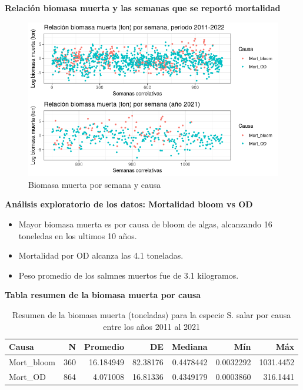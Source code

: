 \documentclass[
  ignorenonframetext,
]{beamer}
\begin{document}
\begin{frame}{\textbf{Relación biomasa muerta y las semanas que se
reportó mortalidad}}
\protect\hypertarget{relaciuxf3n-biomasa-muerta-y-las-semanas-que-se-reportuxf3-mortalidad}{}
\begin{figure}

{\centering \includegraphics[width=0.9\linewidth]{Biomasa_muerta_semana_causa} 

}

\caption{Biomasa muerta por semana y causa}\label{fig:unnamed-chunk-3}
\end{figure}
\end{frame}

\begin{frame}{\textbf{Análisis exploratorio de los datos: Mortalidad
bloom vs OD}}
\protect\hypertarget{anuxe1lisis-exploratorio-de-los-datos-mortalidad-bloom-vs-od}{}
\begin{itemize}
\item
  Mayor biomasa muerta es por causa de bloom de algas, alcanzando 16
  toneledas en los ultimos 10 años.
\item
  Mortalidad por OD alcanza las 4.1 toneladas.
\item
  Peso promedio de los salmnes muertos fue de 3.1 kilogramos.
\end{itemize}
\end{frame}

\begin{frame}{\textbf{Tabla resumen de la biomasa muerta por causa}}
\protect\hypertarget{tabla-resumen-de-la-biomasa-muerta-por-causa}{}
\begin{table}

\caption{\label{tab:unnamed-chunk-4}Resumen de la biomasa muerta (toneladas) para la especie S. salar por causa entre los años 2011 al 2021}
\centering
\begin{tabular}[t]{l|r|r|r|r|r|r}
\hline
Causa & N & Promedio & DE & Mediana & Mín & Máx\\
\hline
Mort\_bloom & 360 & 16.184949 & 82.38176 & 0.4478442 & 0.0032292 & 1031.4452\\
\hline
Mort\_OD & 864 & 4.071008 & 16.81336 & 0.4349179 & 0.0003860 & 316.1441\\
\hline
\end{tabular}
\end{table}
\end{frame}
\end{document}
